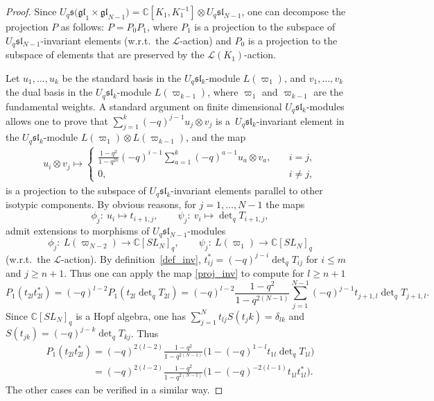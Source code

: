 \documentclass[pdftex]{sigma}
\begin{document}
\begin{proof} Since $U_q \mathfrak{s(gl}_1 \times \mathfrak{gl}_{N-1})=\mathbb C[K_1,K_1^{-1}] \otimes U_q
\mathfrak{sl}_{N-1}$, one can decompose the projection $P$ as follows: $P=P_0P_1$, where $P_1$ is a
projection to the subspace of $U_q \mathfrak{sl}_{N-1}$-invariant elements (w.r.t.\ the $\mathcal{L}$-action)
and $P_0$ is a projection to the subspace of elements that are preserved by the $\mathcal{L}(K_1)$-action.

Let $u_1,\dots,u_k$ be the standard basis in the $U_q \mathfrak{sl}_k$-module $L(\varpi_1)$, and
$v_1,\ldots,v_k$ the dual basis in the $U_q \mathfrak{sl}_k$-module $L(\varpi_{k-1})$, where $\varpi_1$ and
$\varpi_{k-1}$ are the fundamental weights. A standard argument on f\/inite dimensional $U_q
\mathfrak{sl}_k$-modules allows one to prove that $\sum\limits_{j=1}^k (-q)^{j-1}u_j \otimes v_j$ is a~$U_q
\mathfrak{sl}_k$-invariant element in the $U_q \mathfrak{sl}_k$-module $L(\varpi_1) \otimes L(\varpi_{k-1})$,
and the map
\begin{gather}\label{proj_inv}
u_i \otimes v_j \mapsto \begin{cases} \displaystyle \frac{1-q^2}{1-q^{2k}}(-q)^{i-1}\sum_{a=1}^k (-q)^{a-1} u_a \otimes v_a, \quad &  i=j,
\\ 0, \quad & i \neq j,
\end{cases}
\end{gather}
is a projection to the subspace of $U_q \mathfrak{sl}_k$-invariant elements parallel to other isotypic
components. By obvious reasons, for $j=1,\ldots,N-1$ the maps
\[
\phi_j: \ u_i \mapsto t_{i+1,j},\qquad \psi_j: \ v_i \mapsto \det \nolimits_q T_{i+1,j},
 \] admit extensions to morphisms of
$U_q \mathfrak{sl}_{N-1}$-modules
\[
\phi_j: \ L(\varpi_{N-2}) \rightarrow \mathbb C[SL_N]_q, \qquad \psi_j: \ L(\varpi_1) \rightarrow \mathbb
C[SL_N]_q
\]
(w.r.t.\ the $\mathcal{L}$-action). By def\/inition~\eqref{def_inv}, $t_{ij}^*=(-q)^{j-i}\det \nolimits_qT_{ij}$
for $i \leq m$ and $j \geq n+1$. Thus one can apply the map \eqref{proj_inv} to compute for $l \geq n+1$
\[
P_1(t_{2l}t_{2l}^*)=(-q)^{l-2}P_1(t_{2l} \det \nolimits_q T_{2l})
=(-q)^{l-2}\frac{1-q^2}{1-q^{2(N-1)}}\sum_{j=1}^{N-1}(-q)^{j-1}t_{j+1,l}\det \nolimits_q T_{j+1,l}.
\]
Since $\mathbb C[SL_N]_q$ is a Hopf algebra, one has $\sum\limits_{j=1}^{N} t_{lj}S(t_jk)=\delta_{lk}$ and
$S(t_{jk})=(-q)^{j-k}\det \nolimits_q T_{kj}$. Thus
\begin{gather*}
P_1(t_{2l}t_{2l}^*)=(-q)^{2(l-2)}\frac{1-q^2}{1-q^{2(N-1)}}\big( 1-(-q)^{1-l}t_{1l}\det \nolimits_q
T_{1l}\big)
\\
\phantom{P_1(t_{2l}t_{2l}^*)}{} = (-q)^{2(l-2)}\frac{1-q^2}{1-q^{2(N-1)}}\big( 1-(-q)^{-2(l-1)}t_{1l}t_{1l}^*\big).
\end{gather*}
The other cases can be verif\/ied in a similar way. \end{proof}
\end{document}
